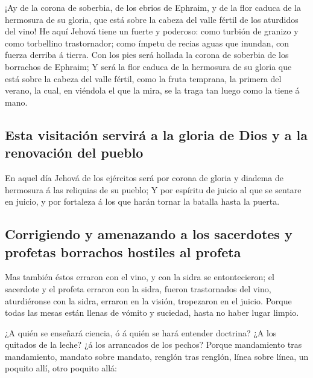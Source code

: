  ¡Ay de la corona de soberbia, de los ebrios de Ephraim, y
de la flor caduca de la hermosura de su gloria, que está sobre la cabeza
del valle fértil de los aturdidos del vino!  He aquí
Jehová tiene un fuerte y poderoso: como turbión de granizo y como
torbellino trastornador; como ímpetu de recias aguas que inundan, con
fuerza derriba á tierra.  Con los pies será hollada la
corona de soberbia de los borrachos de Ephraim;  Y será la
flor caduca de la hermosura de su gloria que está sobre la cabeza del
valle fértil, como la fruta temprana, la primera del verano, la cual, en
viéndola el que la mira, se la traga tan luego como la tiene á mano.

\hypertarget{esta-visitaciuxf3n-serviruxe1-a-la-gloria-de-dios-y-a-la-renovaciuxf3n-del-pueblo}{%
\subsection{Esta visitación servirá a la gloria de Dios y a la
renovación del
pueblo}\label{esta-visitaciuxf3n-serviruxe1-a-la-gloria-de-dios-y-a-la-renovaciuxf3n-del-pueblo}}

 En aquel día Jehová de los ejércitos será por corona de
gloria y diadema de hermosura á las reliquias de su pueblo;
 Y por espíritu de juicio al que se sentare en juicio, y
por fortaleza á los que harán tornar la batalla hasta la puerta.

\hypertarget{corrigiendo-y-amenazando-a-los-sacerdotes-y-profetas-borrachos-hostiles-al-profeta}{%
\subsection{Corrigiendo y amenazando a los sacerdotes y profetas
borrachos hostiles al
profeta}\label{corrigiendo-y-amenazando-a-los-sacerdotes-y-profetas-borrachos-hostiles-al-profeta}}

 Mas también éstos erraron con el vino, y con la sidra se
entontecieron; el sacerdote y el profeta erraron con la sidra, fueron
trastornados del vino, aturdiéronse con la sidra, erraron en la visión,
tropezaron en el juicio.  Porque todas las mesas están
llenas de vómito y suciedad, hasta no haber lugar limpio.

 ¿A quién se enseñará ciencia, ó á quién se hará entender
doctrina? ¿A los quitados de la leche? ¿á los arrancados de los pechos?
 Porque mandamiento tras mandamiento, mandato sobre
mandato, renglón tras renglón, línea sobre línea, un poquito allí, otro
poquito allá:

